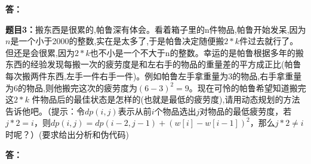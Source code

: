 \documentclass[12pt,a4paper]{article}
\begin{document}
\vspace{5pt}
\noindent
{\bf 答：}

\vspace{5pt}
\noindent
{\bf 题目3：}搬东西是很累的,帕鲁深有体会。看着箱子里的n件物品,帕鲁开始发呆,因为$n$是一个小于2000的整数,实在是太多了,于是帕鲁决定随便搬$2*k$件过去就行了。但还是会很累,因为$2*k$也不小是一个不大于n的整数。幸运的是帕鲁根据多年的搬东西的经验发现每搬一次的疲劳度是和左右手的物品的重量差的平方成正比(帕鲁每次搬两件东西,左手一件右手一件)。例如帕鲁左手拿重量为3的物品,右手拿重量为6的物品,则他搬完这次的疲劳度为$(6-3)^2=9$。现在可怜的帕鲁希望知道搬完这$2*k$ 件物品后的最佳状态是怎样的(也就是最低的疲劳度),请用动态规划的方法告诉他吧。（提示：令$dp(i,j)$表示从前$i$个物品选出$j$对物品的最低疲劳度，若$j*2=i$，则$dp(i,j) = dp(i-2,j-1)+(w[i]-w[i-1])^2$，那么$j*2\neq i$时呢？）(要求给出分析和伪代码)

\vspace{5pt}
\noindent
{\bf 答：}
\end{document}
